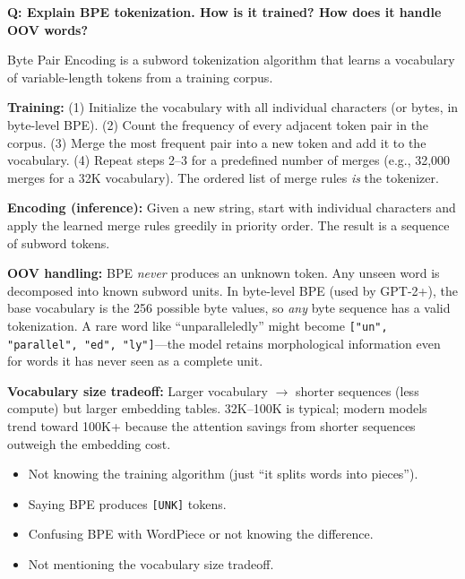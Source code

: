 \begin{interviewq}
\textbf{Q: Explain BPE tokenization.  How is it trained?  How does it handle OOV words?}

 \quad {} \quad \badgefreq{\freqhigh}

\stronganswer
Byte Pair Encoding is a subword tokenization algorithm that learns a vocabulary of
variable-length tokens from a training corpus.

\textbf{Training:}  (1) Initialize the vocabulary with all individual characters (or
bytes, in byte-level BPE).  (2) Count the frequency of every adjacent token pair in the
corpus.  (3) Merge the most frequent pair into a new token and add it to the vocabulary.
(4) Repeat steps 2--3 for a predefined number of merges (e.g., 32,000 merges for a 32K
vocabulary).  The ordered list of merge rules \emph{is} the tokenizer.

\textbf{Encoding (inference):}  Given a new string, start with individual characters and
apply the learned merge rules greedily in priority order.  The result is a sequence of
subword tokens.

\textbf{OOV handling:}  BPE \emph{never} produces an unknown token.  Any unseen word is
decomposed into known subword units.  In byte-level BPE (used by GPT-2+), the base
vocabulary is the 256 possible byte values, so \emph{any} byte sequence has a valid
tokenization.  A rare word like ``unparalleledly'' might become
\texttt{["un", "parallel", "ed", "ly"]}---the model retains morphological information
even for words it has never seen as a complete unit.

\textbf{Vocabulary size tradeoff:}  Larger vocabulary $\to$ shorter sequences (less
compute) but larger embedding tables.  32K--100K is typical; modern models trend toward
100K+ because the attention savings from shorter sequences outweigh the embedding cost.

\redflags
\begin{itemize}
    \item Not knowing the training algorithm (just ``it splits words into pieces'').
    \item Saying BPE produces \texttt{[UNK]} tokens.
    \item Confusing BPE with WordPiece or not knowing the difference.
    \item Not mentioning the vocabulary size tradeoff.
\end{itemize}


\end{interviewq}
